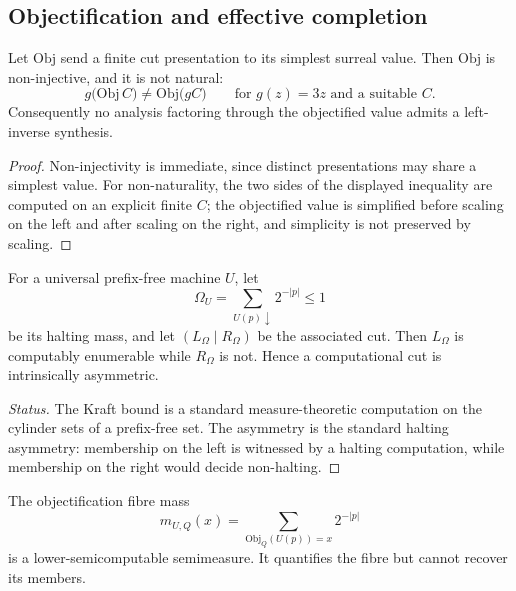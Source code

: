 \subsection{Objectification and effective completion}

\begin{nogo}\label{nogo:objectification}
Let $\mathrm{Obj}$ send a finite cut presentation to its simplest surreal value.  Then
$\mathrm{Obj}$ is non-injective, and it is not natural:
\[
  g\bigl(\mathrm{Obj}\,C\bigr)\neq \mathrm{Obj}\bigl(gC\bigr)
  \qquad\text{for } g(z)=3z \text{ and a suitable } C .
\]
Consequently no analysis factoring through the objectified value admits a left-inverse
synthesis.
\end{nogo}

\begin{proof}
Non-injectivity is immediate, since distinct presentations may share a simplest value.
For non-naturality, the two sides of the displayed inequality are computed on an explicit
finite $C$; the objectified value is simplified before scaling on the left and after
scaling on the right, and simplicity is not preserved by scaling.
\end{proof}

\begin{proposition}\label{prop:effective-onesided}
For a universal prefix-free machine $U$, let
\[
  \Omega_U=\sum_{U(p)\downarrow}2^{-|p|}\le 1
\]
be its halting mass, and let $(L_\Omega\mid R_\Omega)$ be the associated cut.  Then
$L_\Omega$ is computably enumerable while $R_\Omega$ is not.  Hence a computational cut
is intrinsically asymmetric.
\end{proposition}

\begin{proof}[Status]
The Kraft bound is a standard measure-theoretic computation on the cylinder sets of a
prefix-free set.  The asymmetry is the standard halting asymmetry: membership on the left
is witnessed by a halting computation, while membership on the right would decide
non-halting.
\end{proof}

\begin{proposition}\label{prop:mass-not-fibre}
The objectification fibre mass
\[
  m_{U,Q}(x)=\sum_{\mathrm{Obj}_Q(U(p))=x}2^{-|p|}
\]
is a lower-semicomputable semimeasure.  It quantifies the fibre but cannot recover its
members.
\end{proposition}

